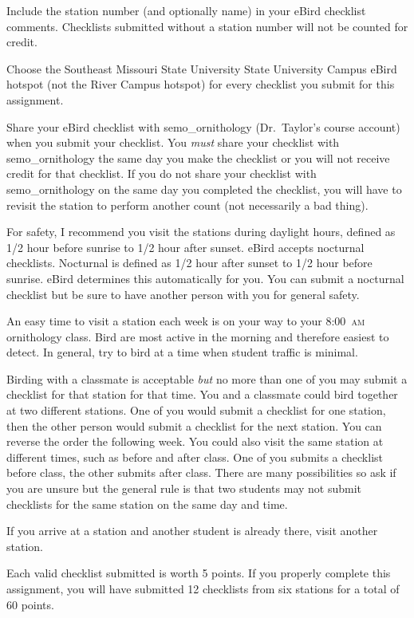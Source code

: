 \documentclass[12pt]{article}
\begin{document}
Include the station number (and optionally name) in your eBird checklist comments. Checklists submitted without a station number will not be counted for credit.

Choose the Southeast Missouri State University State University Campus eBird hotspot (not the River Campus hotspot) for every checklist you submit for this assignment.

Share your eBird checklist with semo\_ornithology (Dr.~Taylor's course account) when you submit your checklist. You \textit{must} share your checklist with semo\_ornithology the same day you make the checklist or you will not receive credit for that checklist. If you do not share your checklist with semo\_ornithology on the same day you completed the checklist, you will have to revisit the station to perform another count (not necessarily a bad thing).

For safety, I recommend you visit the stations during daylight hours, defined as 1/2 hour before sunrise to 1/2 hour after sunset. eBird accepts nocturnal checklists. Nocturnal is defined as 1/2 hour after sunset to 1/2 hour before sunrise. eBird determines this automatically for you. You can submit a nocturnal checklist but be sure to have another person with you for general safety.

An easy time to visit a station each week is on your way to your 8:00~\textsc{am} ornithology class. Bird are most active in the morning and therefore easiest to detect. In general, try to bird at a time when student traffic is minimal.

Birding with a classmate is acceptable \textit{but} no more than one of you may submit a checklist for that station for that time. You and a classmate could bird together at two different stations. One of you would submit a checklist for one station, then the other person would submit a checklist for the next station. You can reverse the order the following week.  You could also visit the same station at different times, such as before and after class. One of you submits a checklist before class, the other submits after class. There are many possibilities so ask if you are unsure but the general rule is that two students may not submit checklists for the same station on the same day and time.

If you arrive at a station and another student is already there, visit another station.

Each valid checklist submitted is worth 5 points. If you properly complete this assignment, you will have submitted 12 checklists from six stations for a total of 60 points.
\end{document}
